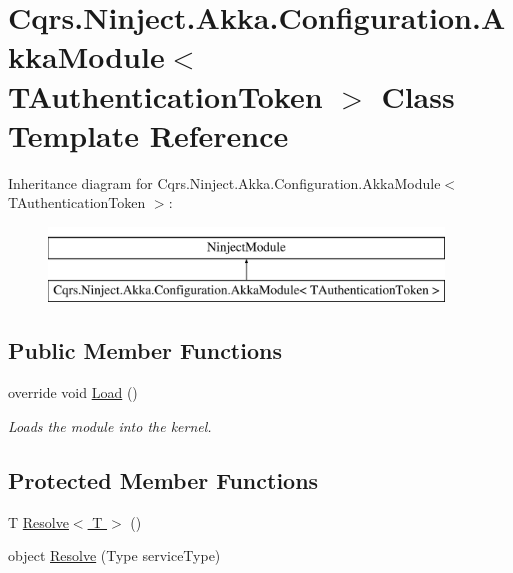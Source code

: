\hypertarget{classCqrs_1_1Ninject_1_1Akka_1_1Configuration_1_1AkkaModule}{}\section{Cqrs.\+Ninject.\+Akka.\+Configuration.\+Akka\+Module$<$ T\+Authentication\+Token $>$ Class Template Reference}
\label{classCqrs_1_1Ninject_1_1Akka_1_1Configuration_1_1AkkaModule}
Inheritance diagram for Cqrs.\+Ninject.\+Akka.\+Configuration.\+Akka\+Module$<$ T\+Authentication\+Token $>$\+:\begin{figure}[H]
\begin{center}
\leavevmode
\includegraphics[height=2.000000cm]{classCqrs_1_1Ninject_1_1Akka_1_1Configuration_1_1AkkaModule}
\end{center}
\end{figure}
\subsection*{Public Member Functions}
\begin{DoxyCompactItemize}
\item 
override void \hyperlink{classCqrs_1_1Ninject_1_1Akka_1_1Configuration_1_1AkkaModule_ac20ff271987cecce0c8e0d8507adefc0}{Load} ()
\begin{DoxyCompactList}\small\item\em Loads the module into the kernel. \end{DoxyCompactList}\end{DoxyCompactItemize}
\subsection*{Protected Member Functions}
\begin{DoxyCompactItemize}
\item 
T \hyperlink{classCqrs_1_1Ninject_1_1Akka_1_1Configuration_1_1AkkaModule_a27665aec43ab831758d85bce822e38d6}{Resolve$<$ T $>$} ()
\item 
object \hyperlink{classCqrs_1_1Ninject_1_1Akka_1_1Configuration_1_1AkkaModule_ab5fee79572d239a8bf4e30080c1b8fe8}{Resolve} (Type service\+Type)
\end{DoxyCompactItemize}


